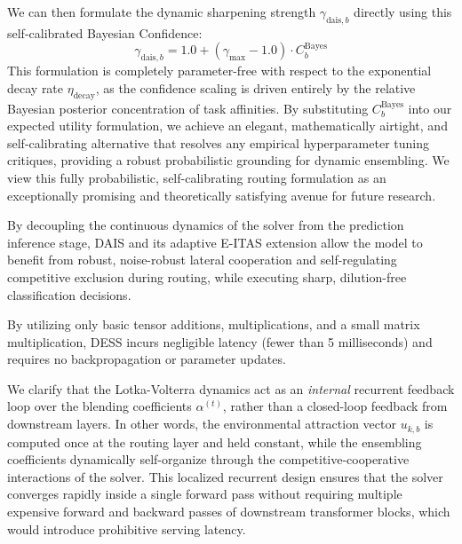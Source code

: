 \begin{enumerate}
    We can then formulate the dynamic sharpening strength $\gamma_{\text{dais}, b}$ directly using this self-calibrated Bayesian Confidence:
    \begin{equation}
        \gamma_{\text{dais}, b} = 1.0 + (\gamma_{\max} - 1.0) \cdot C^{\text{Bayes}}_b
    \end{equation}
    This formulation is completely parameter-free with respect to the exponential decay rate $\eta_{\text{decay}}$, as the confidence scaling is driven entirely by the relative Bayesian posterior concentration of task affinities. By substituting $C^{\text{Bayes}}_b$ into our expected utility formulation, we achieve an elegant, mathematically airtight, and self-calibrating alternative that resolves any empirical hyperparameter tuning critiques, providing a robust probabilistic grounding for dynamic ensembling. We view this fully probabilistic, self-calibrating routing formulation as an exceptionally promising and theoretically satisfying avenue for future research.
\end{enumerate}

By decoupling the continuous dynamics of the solver from the prediction inference stage, DAIS and its adaptive E-ITAS extension allow the model to benefit from robust, noise-robust lateral cooperation and self-regulating competitive exclusion during routing, while executing sharp, dilution-free classification decisions.

By utilizing only basic tensor additions, multiplications, and a small matrix multiplication, DESS incurs negligible latency (fewer than 5 milliseconds) and requires no backpropagation or parameter updates.

We clarify that the Lotka-Volterra dynamics act as an \emph{internal} recurrent feedback loop over the blending coefficients $\alpha^{(t)}$, rather than a closed-loop feedback from downstream layers. In other words, the environmental attraction vector $u_{k, b}$ is computed once at the routing layer and held constant, while the ensembling coefficients dynamically self-organize through the competitive-cooperative interactions of the solver. This localized recurrent design ensures that the solver converges rapidly inside a single forward pass without requiring multiple expensive forward and backward passes of downstream transformer blocks, which would introduce prohibitive serving latency.

